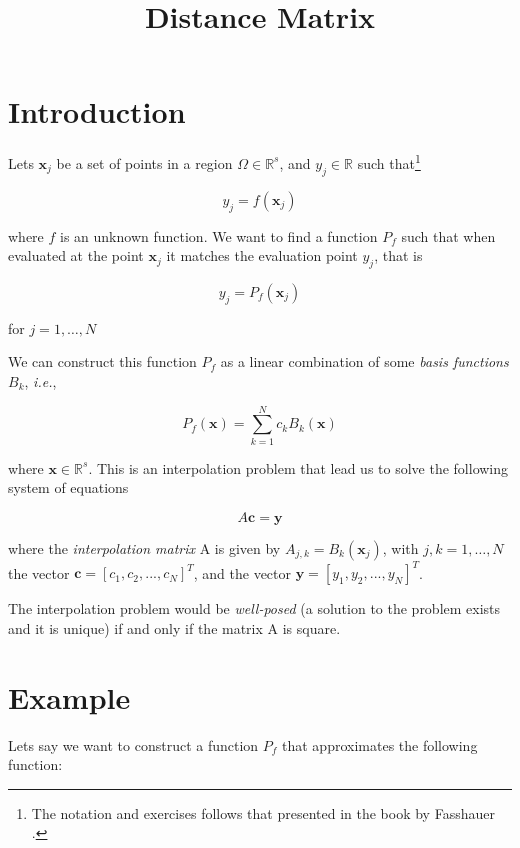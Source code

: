 \documentclass[11pt]{article}
\date{}
\title{Distance Matrix}
\begin{document}
\maketitle
\singlespacing

\section*{Introduction}
\label{sec-1}


Lets $\mathbf{x}_{j}$ be a set of points in a region $\Omega \in
\mathbb{R}^{s}$, and $y_{j} \in \mathbb{R}$ such that\footnote{The
notation and exercises follows that presented in the book by Fasshauer
\cite{Fasshauer:2007:BK}.}

\begin{equation}
 y_{j} = f(\mathbf{x}_{j})
\end{equation}

where $f$ is an unknown function. We want to find a function $P_{f}$
such that when evaluated at the point $\mathbf{x}_{j}$ it matches the
evaluation point $y_{j}$, that is

\begin{equation}
 y_{j} = P_{f}(\mathbf{x}_{j})
\end{equation}

for $j=1,\ldots,N$

We can construct this function $P_{f}$ as a linear combination of some
\emph{basis functions} $B_{k}$, \emph{i.e.},

\begin{equation}
 P_{f}(\mathbf{x}) = \sum_{k=1}^N c_k B_{k}(\mathbf{x})
\end{equation}

where $\mathbf{x} \in \mathbb{R}^{s}$. This is an interpolation
problem that lead us to solve the following system of equations

\begin{equation}
 A \mathbf{c} = \mathbf{y}
\end{equation}

where the \emph{interpolation matrix} A is given by $A_{j,k} =
B_{k}(\mathbf{x}_{j})$, with $j,k=1,\ldots,N$ the vector $\mathbf{c} =
[c_1, c_2, ..., c_{N}]^T$, and the vector $\mathbf{y} = [y_{1},
y_{2}, ..., y_{N}]^T$.

The interpolation problem would be \emph{well-posed} (a solution to the
problem exists and it is unique) if and only if the matrix A is
square.

\section*{Example}
\label{sec-2}
Lets say we want to construct a function $P_{f}$ that approximates the
following function:
\end{document}
